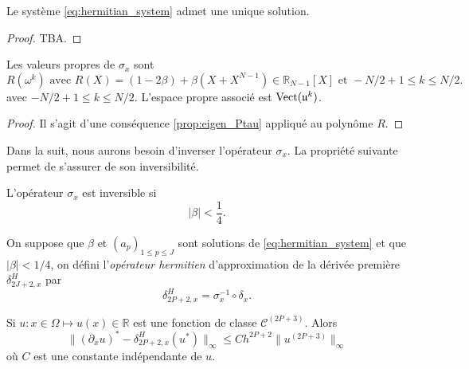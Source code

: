 \begin{proposition}
Le système \eqref{eq:hermitian_system} admet une unique solution.
\end{proposition}

\begin{proof}
TBA.
\end{proof}

\begin{proposition}
Les valeurs propres de $\sigma_x$ sont
\begin{equation}
R(\omega^k) \text{ avec } R(X) = (1-2 \beta) + \beta(X+X^{N-1}) \in \mathbb{R}_{N-1}[X] \text{ et } -N/2+1 \leq k \leq N/2.
\end{equation}
avec $-N/2+1 \leq k \leq N/2$. L'espace propre associé est $\text{Vect} ( \mathfrak{u}^k )$.
\end{proposition}

\begin{proof}
Il s'agit d'une conséquence \ref{prop:eigen_Ptau} appliqué au polynôme $R$.
\end{proof}
Dans la suit, nous aurons besoin d'inverser l'opérateur $\sigma_x$. La propriété suivante permet de s'assurer de son inversibilité.
\begin{corollaire}
L'opérateur $\sigma_x$ est inversible si
\begin{equation}
| \beta | < \dfrac{1}{4}.
\end{equation}
\end{corollaire}

\begin{definition}
On suppose que $\beta$ et $(a_p)_{1 \leq p \leq J}$ sont solutions de \eqref{eq:hermitian_system} et que $|\beta| < 1/4$, on défini l'\textit{opérateur hermitien} d'approximation de la dérivée première $\delta_{2J+2,x}^H$ par 
\begin{equation}
\delta_{2P+2,x}^H = \sigma_x^{-1} \circ \delta_{x}.
\end{equation}
\end{definition}

\begin{theoreme}
Si $u : x \in \Omega \mapsto u(x) \in \mathbb{R}$ est une fonction de classe $\mathcal{C}^{(2P+3)}$.
Alors 
\begin{equation}
\| (\partial_x u)^* - \delta_{2P+2,x}^H (u^*) \|_{\infty} \leq C h^{2P+2} \| u^{(2P+3)} \|_{\infty}
\end{equation}
où $C$ est une constante indépendante de $u$.
\label{th:consistence_herm2}
\end{theoreme}

